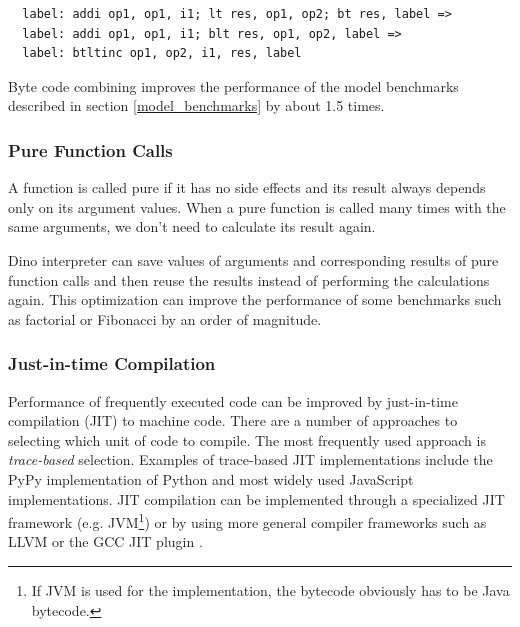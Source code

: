 \documentclass[preprint]{sigplanconf}
\begin{document}
{\scriptsize
\begin{verbatim}
  label: addi op1, op1, i1; lt res, op1, op2; bt res, label =>
  label: addi op1, op1, i1; blt res, op1, op2, label =>
  label: btltinc op1, op2, i1, res, label
\end{verbatim}
}

  Byte code combining improves the performance of the model benchmarks described in section \ref{model_benchmarks} by about 1.5 times.

\subsubsection{Pure Function Calls}

  A function is called pure if it has no side effects and
its result always depends only on its argument values.
  When a pure function is called many times with
the same arguments, we don't need to calculate its result again.

  Dino interpreter can save values of arguments and corresponding
results of pure function calls and then reuse the results instead of
performing the calculations again.  This optimization can improve the performance
of some benchmarks such as factorial or Fibonacci by an order of magnitude.

\subsubsection{Just-in-time Compilation}

  Performance of frequently executed code can be improved by just-in-time
compilation (JIT) to machine code. There are a number of approaches to selecting which unit of 
code to compile. The most frequently used approach is \emph{trace-based} selection.
Examples of trace-based JIT implementations include the PyPy implementation of Python and 
most widely used JavaScript implementations.
JIT compilation can be implemented through a specialized JIT framework
(e.g. JVM\footnote{If JVM is used for the implementation, the bytecode obviously has to be Java bytecode.})
or by using more general compiler frameworks such as LLVM or the GCC JIT plugin \cite{Lattner} \cite{Malcolm}.
\end{document}
